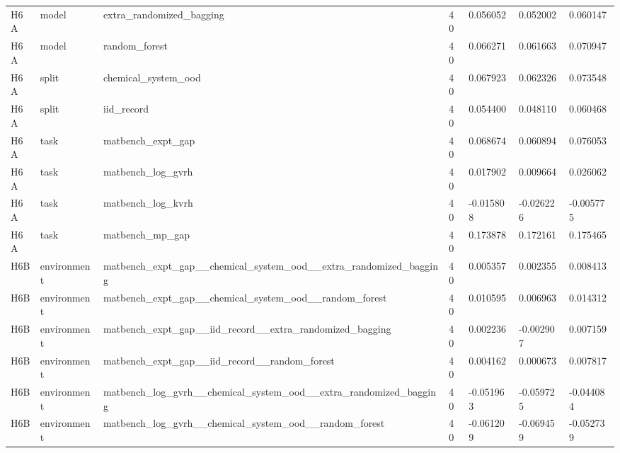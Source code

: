 \documentclass[10pt]{article}
\begin{document}
\begin{landscape}
\begin{longtable}{L{.35in}L{.6in}L{3.55in}L{.4in}L{.88in}L{.88in}L{.88in}}
H6A & model & extra\_\allowbreak{}randomized\_\allowbreak{}bagging & 40 & 0.056052 & 0.052002 & 0.060147\\
H6A & model & random\_\allowbreak{}forest & 40 & 0.066271 & 0.061663 & 0.070947\\
H6A & split & chemical\_\allowbreak{}system\_\allowbreak{}ood & 40 & 0.067923 & 0.062326 & 0.073548\\
H6A & split & iid\_\allowbreak{}record & 40 & 0.054400 & 0.048110 & 0.060468\\
H6A & task & matbench\_\allowbreak{}expt\_\allowbreak{}gap & 40 & 0.068674 & 0.060894 & 0.076053\\
H6A & task & matbench\_\allowbreak{}log\_\allowbreak{}gvrh & 40 & 0.017902 & 0.009664 & 0.026062\\
H6A & task & matbench\_\allowbreak{}log\_\allowbreak{}kvrh & 40 & -0.015808 & -0.026226 & -0.005775\\
H6A & task & matbench\_\allowbreak{}mp\_\allowbreak{}gap & 40 & 0.173878 & 0.172161 & 0.175465\\
H6B & environment & matbench\_\allowbreak{}expt\_\allowbreak{}gap\_\allowbreak{}\_\allowbreak{}chemical\_\allowbreak{}system\_\allowbreak{}ood\_\allowbreak{}\_\allowbreak{}extra\_\allowbreak{}randomized\_\allowbreak{}bagging & 40 & 0.005357 & 0.002355 & 0.008413\\
H6B & environment & matbench\_\allowbreak{}expt\_\allowbreak{}gap\_\allowbreak{}\_\allowbreak{}chemical\_\allowbreak{}system\_\allowbreak{}ood\_\allowbreak{}\_\allowbreak{}random\_\allowbreak{}forest & 40 & 0.010595 & 0.006963 & 0.014312\\
H6B & environment & matbench\_\allowbreak{}expt\_\allowbreak{}gap\_\allowbreak{}\_\allowbreak{}iid\_\allowbreak{}record\_\allowbreak{}\_\allowbreak{}extra\_\allowbreak{}randomized\_\allowbreak{}bagging & 40 & 0.002236 & -0.002907 & 0.007159\\
H6B & environment & matbench\_\allowbreak{}expt\_\allowbreak{}gap\_\allowbreak{}\_\allowbreak{}iid\_\allowbreak{}record\_\allowbreak{}\_\allowbreak{}random\_\allowbreak{}forest & 40 & 0.004162 & 0.000673 & 0.007817\\
H6B & environment & matbench\_\allowbreak{}log\_\allowbreak{}gvrh\_\allowbreak{}\_\allowbreak{}chemical\_\allowbreak{}system\_\allowbreak{}ood\_\allowbreak{}\_\allowbreak{}extra\_\allowbreak{}randomized\_\allowbreak{}bagging & 40 & -0.051963 & -0.059725 & -0.044084\\
H6B & environment & matbench\_\allowbreak{}log\_\allowbreak{}gvrh\_\allowbreak{}\_\allowbreak{}chemical\_\allowbreak{}system\_\allowbreak{}ood\_\allowbreak{}\_\allowbreak{}random\_\allowbreak{}forest & 40 & -0.061209 & -0.069459 & -0.052739\\

\end{longtable}
\end{landscape}
\end{document}
